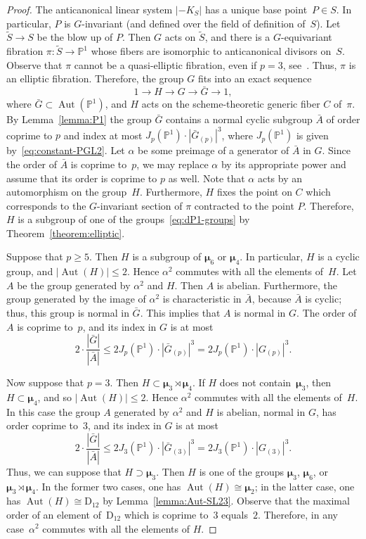 \documentclass[12pt]{amsart}
\numberwithin{equation}{section}
\theoremstyle{definition}
\newcommand{\mumu}{\boldsymbol{\mu}}
\newcommand{\PP}{\mathbb P}
\newcommand{\DD}{\mathrm D}
\DeclareMathOperator{\Aut}{Aut}
\def \ge {\geqslant}
\def \le {\leqslant}
\begin{document}
\begin{proof}
The anticanonical linear system $|-K_S|$ has a unique base point~\mbox{$P\in S$}.
In particular, $P$ is $G$-invariant (and defined over the field of definition of~$S$).
Let $\tilde{S}\to S$ be the blow up of $P$.
Then $G$ acts on $\tilde{S}$, and there is a
$G$-equivariant fibration $\pi\colon \tilde{S}\to\PP^1$ whose
fibers are isomorphic to anticanonical divisors on~$S$.
Observe that $\pi$ cannot be a quasi-elliptic fibration, even if $p=3$,
see~\mbox{\cite[Lemma~3.3(3)]{BLRT}}.
Thus, $\pi$ is an elliptic fibration.
Therefore, the group $G$ fits into an exact sequence
$$
1\to H\to G\to \bar{G}\to 1,
$$
where $\bar{G}\subset\Aut(\PP^1)$, and $H$ acts on the scheme-theoretic generic fiber
$C$ of~$\pi$.
By Lemma~\ref{lemma:P1} the group $\bar{G}$ contains a normal cyclic subgroup $\bar{A}$ of order
coprime to $p$ and index at most $J_p(\PP^1)\cdot |\bar{G}_{(p)}|^3$, where $J_p(\PP^1)$ is given by~\eqref{eq:constant-PGL2}. Let $\alpha$ be some preimage of a generator of $\bar{A}$ in $G$.
Since the order of $\bar{A}$ is coprime to~$p$, we may replace $\alpha$ by its appropriate
power and assume that its order is coprime to $p$ as well.
Note that $\alpha$ acts by an automorphism on the group~$H$.
Furthermore, $H$ fixes the point on $C$ which corresponds
to the $G$-invariant section of $\pi$
contracted to the point $P$. Therefore,
$H$ is a subgroup of one of the groups~\eqref{eq:dP1-groups}
by Theorem~\ref{theorem:elliptic}.

Suppose that $p\ge 5$. Then $H$ is a subgroup of $\mumu_6$ or $\mumu_4$.
In particular, $H$ is a cyclic group, and $|\Aut(H)|\le 2$. Hence $\alpha^2$
commutes with all the elements of~$H$. Let $A$ be the group generated
by $\alpha^2$ and $H$. Then $A$ is abelian. Furthermore, the group generated by the image of $\alpha^2$ is characteristic
in $\bar{A}$, because $\bar{A}$ is cyclic; thus, this group is normal in $\bar{G}$.
This implies that $A$ is normal in $G$. The order of $A$ is coprime to~$p$, and
its index in $G$ is at most
$$
2\cdot\frac{|\bar{G}|}{|\bar{A}|}\le
2J_p(\PP^1)\cdot |\bar{G}_{(p)}|^3=2J_p(\PP^1)\cdot |G_{(p)}|^3.
$$

Now suppose that $p=3$. Then $H\subset \mumu_3\rtimes\mumu_4$.
If $H$ does not contain~\mbox{$\mumu_3$}, then~\mbox{$H\subset\mumu_4$}, and so
$|\Aut(H)|\le 2$. Hence $\alpha^2$
commutes with all the elements of~$H$. In this case the group $A$
generated by $\alpha^2$ and $H$ is abelian,
normal in $G$, has order coprime to~$3$, and its index in $G$
is at most
$$
2\cdot\frac{|\bar{G}|}{|\bar{A}|}\le
2J_3(\PP^1)\cdot |\bar{G}_{(3)}|^3=2J_3(\PP^1)\cdot |G_{(3)}|^3.
$$
Thus, we can suppose that $H\supset\mumu_3$.
Then $H$ is one of the groups $\mumu_3$, $\mumu_6$, or~\mbox{$\mumu_3\rtimes\mumu_4$}.
In the former two cases, one has $\Aut(H)\cong\mumu_2$; in the latter case,
one has $\Aut(H)\cong\DD_{12}$ by Lemma~\ref{lemma:Aut-SL23}.
Observe that the maximal order of an element of~$\DD_{12}$ which is coprime to~$3$ equals~$2$.
Therefore, in any case~$\alpha^2$ commutes with all the elements of $H$.


\end{proof}
\end{document}
